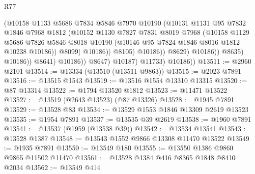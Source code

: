 \begin{lexlean}{R77}
\begin{coremodule}
                                      (@10158
                                        @1133
                                        @5686
                                        @7834
                                        @5846
                                        @7970
                                        @10190
                                        (@10131
                                          @1131
                                          @95
                                          @7832
                                          @1846
                                          @7968
                                          @1812
                                          (@10152
                                            @1130
                                            @7827
                                            @7831
                                            @8019
                                            @7968
                                            (@10158
                                              @1129
                                              @5686
                                              @7826
                                              @5846
                                              @8018
                                              @10190
                                              (@10146 @95 @7824 @1846 @8016 @1812 @10238 @10186))
                                            @8099)
                                          @10186))
                                      @8105)
                                    @10186))
                                @8629)
                              @10186))
                          @8635)
                        @10186))
                    @8641)
                  @10186))
              @8647)
            @10187)
          @11733)
        @10186))
@13511 := @2960 @2101
@13514 := @13334 (@13510 (@13511 @9863))
@13515 := @2023 @7891
@13516 := @13515 @1543
@13519 := @13516 @1554 @13310 @13315
@13520 := @87 @13314
@13522 := @1794 @13520 @1812
@13523 := @11471 @13522
@13527 := @13519 (@2643 @13523) (@87 @13326)
@13528 := @1945 @7891
@13529 := @13528 @83
@13534 := @13529 @1553 @1846 @13309 @2619 @13523
@13535 := @1954 @7891
@13537 := @13535 @39 @2619
@13538 := @1960 @7891
@13541 := @13537 (@1959 (@13538 @39))
@13542 := @13534 @13541
@13543 := @13528 @1387
@13548 := @13543 @1552 @9866 @13308 @11470 @13522
@13549 := @1935 @7891
@13550 := @13549 @180
@13555 := @13550 @1386 @9860 @9865 @11502 @11470
@13561 := @13528 @1384 @416 @8365 @1848 @8410 @2034
@13562 := @13549 @414

\end{coremodule}
\end{lexlean}
